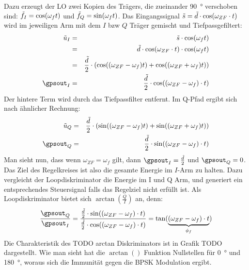 Dazu erzeugt der LO zwei Kopien des Trägers, die zueinander \SI{90}{\degree} verschoben sind: $\tilde{f}_I=\cos(\omega_{f} t)$ und  $\tilde{f}_Q=\sin(\omega_{f} t)$. Das Eingangssignal $\tilde{s}=\tilde{d} \cdot \cos(\omega_{ZF} \cdot t)$ wird im jeweiligen Arm mit dem $I$ bzw $Q$ Träger gemischt und Tiefpassgefiltert:
\begin{eqnarray}
	\gpsmx_I &=& \gpsin \cdot \cos(\omega_{f} t)\\
		    &=& \gpsdat \cdot \cos(\omega_{ZF} \cdot t) \cdot \cos(\omega_{f} t)\\
            &=& \frac{\gpsdat}{2} \cdot (\cos((\omega_{ZF}-\omega_{f}) t)+ \cos((\omega_{ZF}+\omega_{f}) t)) \\
    \gpsout_I &=& \frac{\gpsdat}{2} \cdot \cos((\omega_{ZF}-\omega_{f})\cdot t)
\end{eqnarray}
Der hintere Term wird durch das Tiefpassfilter entfernt. Im Q-Pfad ergibt sich nach ähnlicher Rechnung:
\begin{eqnarray}
\gpsmx_Q &=& \frac{\gpsdat}{2} \cdot (\sin((\omega_{ZF}-\omega_{f}) t)+ \sin((\omega_{ZF}+\omega_{f}) t))\\
\gpsout_Q &=& \frac{\gpsdat}{2} \cdot \sin((\omega_{ZF}-\omega_{f})\cdot t)
\end{eqnarray}
Man sieht nun, dass wenn $\omega_{ZF}=\omega_{f}$ gilt, dann $\gpsout_I = \frac{\gpsdat}{2}$  und $\gpsout_Q =0$. Das Ziel des Regelkreises ist also die gesamte Energie im $I$-Arm zu halten. 
Dazu vergleicht der Loopdiskriminator die Energie im I und Q Arm, und generiert ein entsprechendes Steuersignal falls das Regelziel nicht erfüllt ist. Als Loopdiskriminator bietet sich $\arctan\left(\frac{Q}{I}\right)$ an, denn: 
\begin{equation}
	\frac{\gpsout_Q}{\gpsout_I} = \frac{ \frac{\gpsdat}{2} \cdot \sin((\omega_{ZF}-\omega_{f})\cdot t)}{\frac{\gpsdat}{2} \cdot \cos((\omega_{ZF}-\omega_{f})\cdot t)} = \tan({\underbrace{(\omega_{ZF}-\omega_{f})\cdot t}_{\phi_f}})
\end{equation}
Die Charakteristik des TODO arctan Diskriminators ist in Grafik TODO dargestellt. Wie man sieht hat die $\arctan()$ Funktion Nullstellen für \SI{0}{\degree} und \SI{180}{\degree}, woraus sich die Immunität gegen die BPSK Modulation ergibt.

